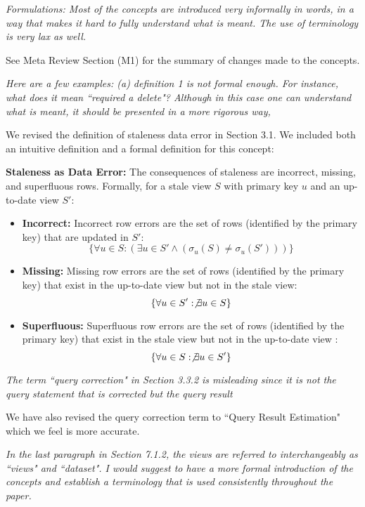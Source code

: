 \vspace{1em}
\emph{Formulations: Most of the concepts are introduced very informally in words, in a way that makes it hard to fully understand what is meant. The use of terminology is very lax as well. }

See Meta Review Section (M1) for the summary of changes made to the concepts.

\vspace{1em}
\emph{Here are a few examples: (a) definition 1 is not formal enough. For instance, what does it mean ``required a delete"? Although in this case one can understand what is meant, it should be presented in a more rigorous way,} 

We revised the definition of staleness data error in Section 3.1. We included both an intuitive definition and a formal definition for this concept:
\begin{displayquote} 
\noindent \textbf{Staleness as Data Error: } The consequences of staleness are incorrect, missing, and superfluous rows. 
Formally, for a stale view $S$ with primary key $u$ and an up-to-date view $S'$:
\begin{itemize}[noitemsep] \sloppy
	\item \textbf{Incorrect: } Incorrect row errors are the set of rows (identified by the primary key) that are updated in $S'$: \[\{\forall u \in S : (\exists u \in S' \wedge (\sigma_u(S) \ne \sigma_u(S')))\}\]
	\item \textbf{Missing: } Missing row errors are the set of rows (identified by the primary key) that exist in the up-to-date view but not in the stale view: \[\{\forall u \in S' : \not \exists u \in S\}\]
	\item \textbf{Superfluous: } Superfluous row errors are the set of rows (identified by the primary key) that exist in the stale view but not in the up-to-date view : \[\{ \forall u \in S : \not\exists u \in S' \}\]
\end{itemize}
\end{displayquote} 

\vspace{1em}
\emph{The term ``query correction" in Section 3.3.2 is misleading since it is not the query statement that is corrected but the query result}

We have also revised the query correction term to ``Query Result Estimation" which we feel is more accurate.

\vspace{1em}
\emph{In the last paragraph in Section 7.1.2, the views are referred to interchangeably as ``views" and ``dataset". I would suggest to have a more formal introduction of the concepts and establish a terminology that is used consistently throughout the paper.}

